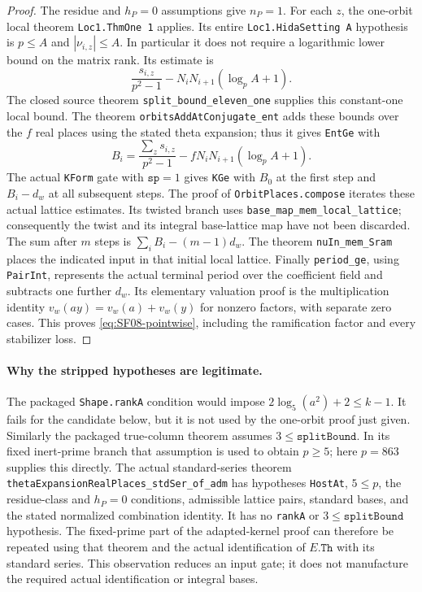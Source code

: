 \begin{proof}
The residue and $h_P=0$ assumptions give $n_P=1$.
For each $z$, the one-orbit local theorem
\texttt{Loc1.ThmOne 1} applies.  Its entire
\texttt{Loc1.HidaSetting A} hypothesis is
$p\le A$ and $|\nu_{i,z}|\le A$.
In particular it does not require a logarithmic lower bound on the
matrix rank.  Its estimate is
\[
 \frac{s_{i,z}}{p^2-1}
       -N_iN_{i+1}(\log_p A+1).
\]
The closed source theorem
\texttt{split\_bound\_eleven\_one} supplies this constant-one local
bound.  The theorem \texttt{orbitsAddAtConjugate\_ent} adds these
bounds over the $f$ real places using the stated theta expansion;
thus it gives \texttt{EntGe} with
\[
 B_i=\frac{\sum_zs_{i,z}}{p^2-1}
                   -fN_iN_{i+1}(\log_p A+1).
\]
The actual \texttt{KForm} gate with $\texttt{sp}=1$ gives
\texttt{KGe} with $B_0$ at the first step and $B_i-d_w$ at
all subsequent steps.  The proof of \texttt{OrbitPlaces.compose}
iterates these actual lattice estimates.  Its twisted branch uses
\texttt{base\_map\_mem\_local\_lattice}; consequently the twist
and its integral base-lattice map have not been discarded.
The sum after $m$ steps is $\sum_i B_i-(m-1)d_w$.
The theorem \texttt{nuIn\_mem\_Sram} places the indicated input in
that initial local lattice.  Finally \texttt{period\_ge}, using
\texttt{PairInt}, represents the actual terminal period over the
coefficient field and subtracts one further $d_w$.  Its elementary
valuation proof is the multiplication identity
$v_w(ay)=v_w(a)+v_w(y)$ for nonzero factors, with separate zero cases.
This proves \eqref{eq:SF08-pointwise}, including the ramification
factor and every stabilizer loss.
\end{proof}

\paragraph{Why the stripped hypotheses are legitimate.}
The packaged \texttt{Shape.rankA} condition would impose
$2\log_5(a^2)+2\le k-1$.  It fails for the candidate below, but
it is not used by the one-orbit proof just given.  Similarly the
packaged true-column theorem assumes $3\le\texttt{splitBound}$.
In its fixed inert-prime branch that assumption is used to obtain
$p\ge5$; here $p=863$ supplies this directly.
The actual standard-series theorem
\texttt{thetaExpansionRealPlaces\_stdSer\_of\_adm} has hypotheses
\texttt{HostAt}, $5\le p$, the residue-class and $h_P=0$ conditions,
admissible lattice pairs, standard bases, and the stated normalized
combination identity.  It has no \texttt{rankA} or
$3\le\texttt{splitBound}$ hypothesis.  The fixed-prime part of the
adapted-kernel proof can therefore be repeated using that theorem
and the actual identification of $E.\texttt{Th}$ with its standard
series.  This observation reduces an input gate; it does not
manufacture the required actual identification or integral bases.

